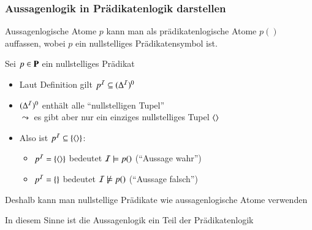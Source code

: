 \documentclass[aspectratio=1610,onlymath]{beamer}
\begin{document}
\begin{frame}\frametitle{Aussagenlogik in Prädikatenlogik darstellen}

Aussagenlogische Atome $p$ kann man als prädikatenlogische Atome $p()$
auffassen, wobei $p$ ein nullstelliges Prädikatensymbol ist.%
\bigskip

Sei $p\in\textbf{\textcolor{black}{P}}$ ein nullstelliges Prädikat\\[1ex]
\pause
\begin{itemize}
\item Laut Definition gilt $p^{\mathcal{I}}\subseteq(\Delta^{\mathcal{I}})^0$\pause
\item $(\Delta^{\mathcal{I}})^0$ enthält alle "`nullstelligen Tupel"'\\
$\leadsto$ es gibt aber nur ein einziges nullstelliges Tupel $\langle{}\rangle$\pause
\item Also ist $p^{\mathcal{I}}\subseteq\{\langle{}\rangle\}$:
	\begin{itemize}
	\item $p^{\mathcal{I}}=\{\langle{}\rangle\}$ bedeutet $\mathcal{I}\models p()$ (\alert{"`Aussage wahr"'})
	\item $p^{\mathcal{I}}=\{\}$ bedeutet $\mathcal{I}\not\models p()$ (\alert{"`Aussage falsch"'})
	\end{itemize}
\end{itemize}

Deshalb kann man nullstellige Prädikate wie aussagenlogische Atome verwenden
\bigskip

In diesem Sinne ist die Aussagenlogik ein Teil der Prädikatenlogik

\end{frame}
\end{document}
